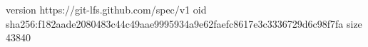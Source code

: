 version https://git-lfs.github.com/spec/v1
oid sha256:f182aade2080483c44c49aae9995934a9e62faefc8617e3c3336729d6c98f7fa
size 43840
